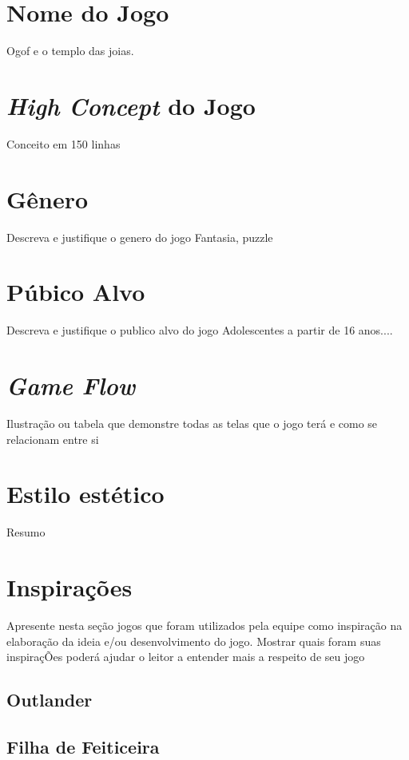 \section{Nome do Jogo}
Ogof e o templo das joias.

\section{\textit{High Concept} do Jogo}
Conceito em 150 linhas


\section{Gênero}

Descreva e justifique o genero do jogo
Fantasia, puzzle

\section{Púbico Alvo}

Descreva e justifique o publico alvo do jogo
Adolescentes a partir de 16 anos....

\section{\textit{Game Flow}}

Ilustração ou tabela que demonstre todas as telas que o jogo terá e como se relacionam entre si

\section{Estilo estético}

Resumo

\section{Inspirações}
Apresente nesta seção jogos que foram utilizados pela equipe como inspiração na elaboração da ideia e/ou desenvolvimento do jogo.
Mostrar quais foram suas inspiraçÕes poderá ajudar o leitor a entender mais a respeito de seu jogo

\subsection{Outlander}
\subsection{Filha de Feiticeira}
